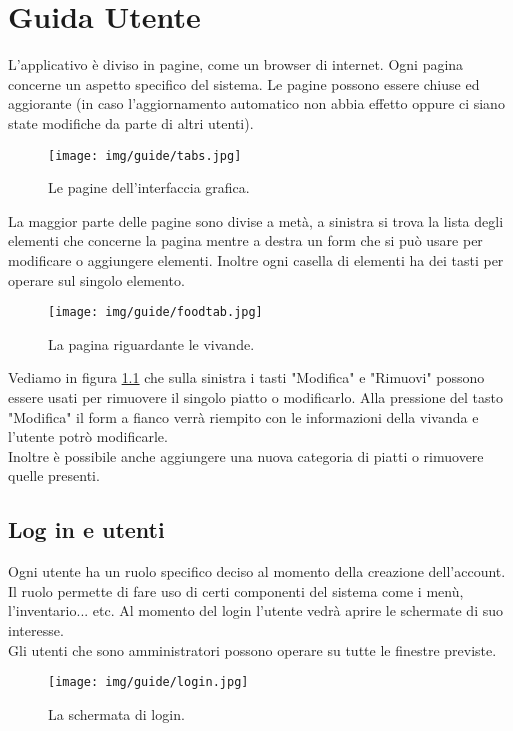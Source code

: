 \documentclass[a4paper,12pt]{report}
\begin{document}
\chapter{Guida Utente}
L'applicativo è diviso in pagine, come un browser di internet. Ogni pagina concerne un aspetto specifico del sistema. Le pagine possono essere chiuse ed aggiorante (in caso l'aggiornamento automatico non abbia effetto oppure ci siano state modifiche da parte di altri utenti). 
\begin{figure}[H]
    \centering
    \texttt{[image: img/guide/tabs.jpg]}
    \caption{Le pagine dell'interfaccia grafica.}
\end{figure}
La maggior parte delle pagine sono divise a metà, a sinistra si trova la lista degli elementi che concerne la pagina mentre a destra un form che si può usare per modificare o aggiungere elementi. Inoltre ogni casella di elementi ha dei tasti per operare sul singolo elemento.
\begin{figure}[H]
    \centering
    \texttt{[image: img/guide/foodtab.jpg]}
    \caption{La pagina riguardante le vivande.}
    \label{foodtab}
\end{figure}
%
Vediamo in figura \ref{foodtab} che sulla sinistra i tasti "Modifica" e "Rimuovi" possono essere usati per rimuovere il singolo piatto o modificarlo. Alla pressione del tasto "Modifica" il form a fianco verrà riempito con le informazioni della vivanda e l'utente potrò modificarle.
\\
Inoltre è possibile anche aggiungere una nuova categoria di piatti o rimuovere quelle presenti.
\section{Log in e utenti}
Ogni utente ha un ruolo specifico deciso al momento della creazione dell'account. Il ruolo permette di fare uso di certi componenti del sistema come i menù, l'inventario... etc. Al momento del login l'utente vedrà aprire le schermate di suo interesse.
\\
Gli utenti che sono amministratori possono operare su tutte le finestre previste.
\begin{figure}[H]
    \centering
    \texttt{[image: img/guide/login.jpg]}
    \caption{La schermata di login.}
\end{figure}
\end{document}
